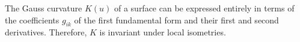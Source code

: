 The Gauss curvature $K(u)$ of a surface can be expressed entirely in terms of the coefficients $g_{ik}$ of the first fundamental form and their first and second derivatives. Therefore, $K$ is invariant under local isometries.